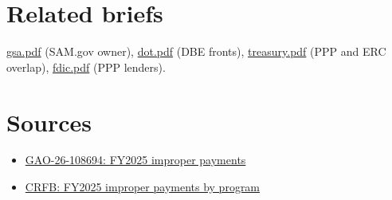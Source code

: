 \documentclass[letterpaper,11pt]{article}
\providecommand{\tightlist}{\setlength{\itemsep}{0pt}\setlength{\parskip}{0pt}}
\begin{document}
\hypertarget{related-briefs}{%
\section{Related briefs}\label{related-briefs}}

\url{gsa.pdf} (SAM.gov owner), \url{dot.pdf} (DBE fronts),
\url{treasury.pdf} (PPP and ERC overlap), \url{fdic.pdf} (PPP lenders).

\hypertarget{sources}{%
\section{Sources}\label{sources}}

\begin{itemize}
\tightlist
\item
  \href{https://www.gao.gov/products/gao-26-108694}{GAO-26-108694:
  FY2025 improper payments}
\item
  \href{https://www.crfb.org/blogs/federal-improper-payments-total-186-billion-fy-2025}{CRFB:
  FY2025 improper payments by program}
\end{itemize}
\end{document}
